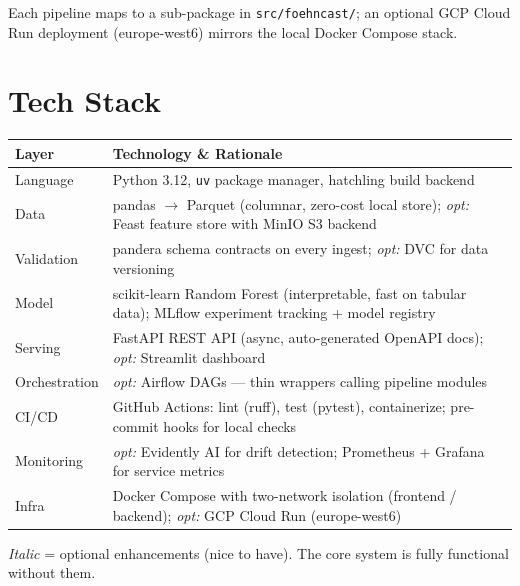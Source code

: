 \documentclass[11pt,a4paper]{article}
\begin{document}
\smallskip
\noindent
Each pipeline maps to a sub-package in \texttt{src/foehncast/};
an optional GCP Cloud Run deployment (europe-west6) mirrors the
local Docker Compose stack.

\section{Tech Stack}

\begin{center}
\footnotesize
\begin{tabularx}{\linewidth}{l@{\hskip 4pt}X}
\toprule
\textbf{Layer} & \textbf{Technology \& Rationale} \\
\midrule
Language      & Python 3.12, \texttt{uv} package manager, hatchling build backend \\
Data          & pandas $\to$ Parquet (columnar, zero-cost local store);
                \textit{opt:} Feast feature store with MinIO S3 backend \\
Validation    & pandera schema contracts on every ingest;
                \textit{opt:} DVC for data versioning \\
Model         & scikit-learn Random Forest (interpretable, fast on tabular data);
                MLflow experiment tracking + model registry \\
Serving       & FastAPI REST API (async, auto-generated OpenAPI docs);
                \textit{opt:} Streamlit dashboard \\
Orchestration & \textit{opt:} Airflow DAGs --- thin wrappers calling pipeline modules \\
CI/CD         & GitHub Actions: lint (ruff), test (pytest), containerize;
                pre-commit hooks for local checks \\
Monitoring    & \textit{opt:} Evidently AI for drift detection;
                Prometheus + Grafana for service metrics \\
Infra         & Docker Compose with two-network isolation (frontend / backend);
                \textit{opt:} GCP Cloud Run (europe-west6) \\
\bottomrule
\end{tabularx}
\end{center}

\smallskip
\footnotesize
\textit{Italic} = optional enhancements (nice to have).
The core system is fully functional without them.
\normalsize
\end{document}
